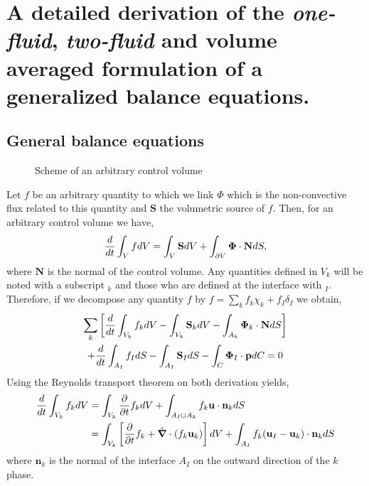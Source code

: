 \chapter{A detailed derivation of the \textit{one-fluid}, \textit{two-fluid} and volume averaged formulation of a generalized balance equations.}
\label{ap:average}

\section{General balance equations}

\begin{figure}
    \centering
    \caption{Scheme of an arbitrary control volume}
\end{figure}

Let $f$  be an arbitrary quantity to which we link $\Phi$ which is the non-convective flux related to this quantity and $\textbf{S}$ the volumetric source of $f$. 
Then, for an arbitrary control volume we have, 
\begin{equation*}
    \frac{d}{d t} \int_{V} f dV 
    = 
    \int_{V} \textbf{S} dV 
    + \int_{\partial V} \mathbf{\Phi}\cdot \textbf{N} dS,
\end{equation*}
where $\textbf{N}$ is the normal of the control volume. 
Any quantities defined in $V_k$ will be noted with a subscript $_k$ and those who are defined at the interface with $_I$. 
Therefore, if we decompose any quantity $f$ by $f = \sum_k f_k \chi_k + f_I \delta_I$ we obtain, 
\begin{multline*}
    \sum_k\left[\frac{d}{d t} \int_{V_k} f_k dV 
    - \int_{V_k} \textbf{S}_k dV 
    - \int_{A_k} \mathbf{\Phi}_k\cdot \textbf{N} dS
    \right]\\
    + \frac{d}{d t} \int_{A_I} f_I dS 
    - \int_{A_I} \textbf{S}_I dS 
    - \int_{C} \mathbf{\Phi}_I\cdot \textbf{p} dC 
    = 0
\end{multline*}
Using the Reynolds transport theorem on both derivation yields,
\begin{align*}
    \frac{d}{d t} \int_{V_k} f_k dV 
    &= \int_{V_k} \frac{\partial}{\partial t} f_k dV 
    + \int_{A_I \cup A_k} f_k \textbf{u} \cdot \textbf{n}_k dS\\
    &= \int_{V_k} \left[
        \frac{\partial}{\partial t} f_k  + \hat{\bm{\nabla}} \cdot (f_k \textbf{u}_k) 
    \right]dV 
    + \int_{A_I} f_k (\textbf{u}_I - \textbf{u}_k) \cdot \textbf{n}_k dS\\
\end{align*}
where $\textbf{n}_k$ is the normal of the interface $A_I$ on the outward direction of the $k$ phase. 

